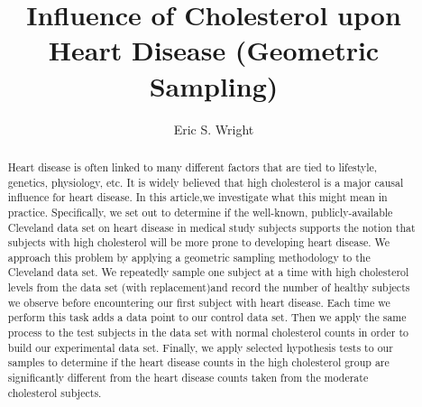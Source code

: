 \documentclass{amsart}
\title{Influence of Cholesterol upon Heart Disease (Geometric Sampling)}
\author{Eric S. Wright}
\begin{document}
\begin{abstract}
Heart disease is often linked to many different factors that are tied to lifestyle, genetics, physiology, etc. It is widely believed that high cholesterol is a major causal influence for heart disease. In this article,we investigate what this might mean in practice. Specifically, we set out to determine if the well-known, publicly-available Cleveland data set on heart disease in medical study subjects supports the notion that subjects with high cholesterol will be more prone to developing heart disease. We approach this problem by applying a geometric sampling methodology to the Cleveland data set. We repeatedly sample one subject at a time with high cholesterol levels from the data set (with replacement)and record the number of healthy subjects we observe before encountering our first subject with heart disease. Each time we perform this task adds a data point to our control data set. Then we apply the same process to the test subjects in the data set with normal cholesterol counts in order to build our experimental data set. Finally, we apply selected hypothesis tests to our samples to determine if the heart disease counts in the high cholesterol group are significantly different from the heart disease counts taken from the moderate cholesterol subjects.
\end{abstract}
\maketitle
\end{document}
